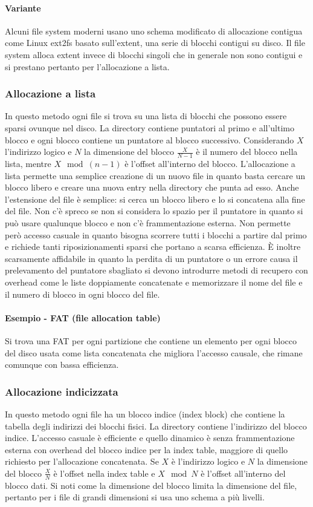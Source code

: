 \paragraph{Variante}
Alcuni file system moderni usano uno schema modificato di allocazione contigua come Linux ext2fs basato sull'extent, una serie di blocchi contigui su disco. Il file system alloca
extent invece di blocchi singoli che in generale non sono contigui e si prestano pertanto per l'allocazione a lista.
\subsubsection{Allocazione a lista}
In questo metodo ogni file si trova su una lista di blocchi che possono essere sparsi ovunque nel disco. La directory contiene puntatori al primo e all'ultimo blocco e ogni blocco
contiene un puntatore al blocco successivo. Considerando $X$ l'indirizzo logico e $N$ la dimensione del blocco $\frac{X}{N-1}$ \`e il numero del blocco nella lista, mentre
$X\mod (n - 1)$ \`e l'offset all'interno del blocco. L'allocazione a lista permette una semplice creazione di un nuovo file in quanto basta cercare un blocco libero e creare una
nuova entry nella directory che punta ad esso. Anche l'estensione del file \`e semplice: si cerca un blocco libero e lo si concatena alla fine del file. Non c'\`e  spreco se non
si considera lo spazio per il puntatore in quanto si pu\`o usare qualunque blocco e non c'\`e frammentazione esterna. Non permette per\`o accesso casuale in quanto bisogna scorrere 
tutti i blocchi a partire dal primo e richiede tanti riposizionamenti sparsi che portano a scarsa efficienza. \`E inoltre scarsamente affidabile in quanto la perdita di un puntatore o 
un errore causa il prelevamento del puntatore sbagliato si devono introdurre metodi di recupero con overhead come le liste doppiamente concatenate e memorizzare il nome del file e il 
numero di blocco in ogni blocco del file. 
\paragraph{Esempio - FAT (file allocation table)} Si trova una FAT per ogni partizione che contiene un elemento per ogni blocco del disco usata come lista concatenata che migliora 
l'accesso causale, che rimane comunque con bassa efficienza. 
\subsubsection{Allocazione indicizzata}
In questo metodo ogni file ha un blocco indice (index block) che contiene la tabella degli indirizzi dei blocchi fisici. La directory contiene l'indirizzo del blocco indice. L'accesso
casuale \`e efficiente e quello dinamico \`e senza frammentazione esterna con overhead del blocco indice per la index table, maggiore di quello richiesto per l'allocazione concatenata. 
Se $X$ \`e l'indirizzo logico e $N$ la dimensione del blocco $\frac{X}{N}$ \`e l'offset nella index table e $X\mod N$ \`e l'offset all'interno del blocco dati. Si noti come la dimensione
del blocco limita la dimensione del file, pertanto per i file di grandi dimensioni si usa uno schema a pi\`u livelli.

